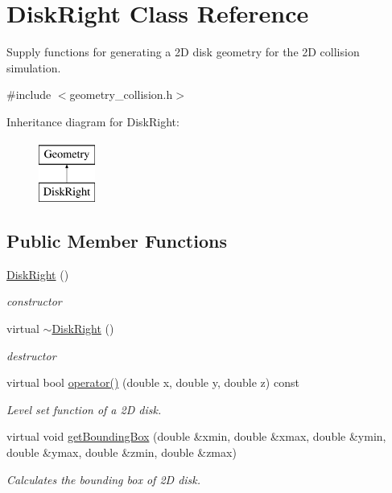 \hypertarget{classDiskRight}{\section{Disk\-Right Class Reference}
\label{classDiskRight}
}


Supply functions for generating a 2\-D disk geometry for the 2\-D collision simulation.  




{\ttfamily \#include $<$geometry\-\_\-collision.\-h$>$}

Inheritance diagram for Disk\-Right\-:\begin{figure}[H]
\begin{center}
\leavevmode
\includegraphics[height=2.000000cm]{classDiskRight}
\end{center}
\end{figure}
\subsection*{Public Member Functions}
\begin{DoxyCompactItemize}
\item 
\hypertarget{classDiskRight_a71de750406ab27525f59cc4997b3e062}{\hyperlink{classDiskRight_a71de750406ab27525f59cc4997b3e062}{Disk\-Right} ()}\label{classDiskRight_a71de750406ab27525f59cc4997b3e062}

\begin{DoxyCompactList}\small\item\em constructor \end{DoxyCompactList}\item 
\hypertarget{classDiskRight_a7a46c4abbc49cc7e80abfb4f662f574f}{virtual \hyperlink{classDiskRight_a7a46c4abbc49cc7e80abfb4f662f574f}{$\sim$\-Disk\-Right} ()}\label{classDiskRight_a7a46c4abbc49cc7e80abfb4f662f574f}

\begin{DoxyCompactList}\small\item\em destructor \end{DoxyCompactList}\item 
virtual bool \hyperlink{classDiskRight_ac88e4b980a4f5ff96ffc09122b44c78a}{operator()} (double x, double y, double z) const 
\begin{DoxyCompactList}\small\item\em Level set function of a 2\-D disk. \end{DoxyCompactList}\item 
virtual void \hyperlink{classDiskRight_ad11b03ddd56c39e6feb6b6704728481b}{get\-Bounding\-Box} (double \&xmin, double \&xmax, double \&ymin, double \&ymax, double \&zmin, double \&zmax)
\begin{DoxyCompactList}\small\item\em Calculates the bounding box of 2\-D disk. \end{DoxyCompactList}\end{DoxyCompactItemize}


